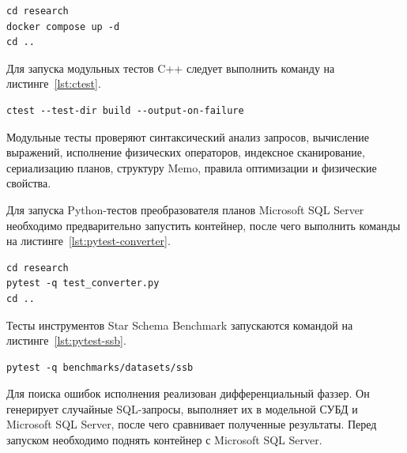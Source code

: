 \documentclass[fontsize=14pt, russian]{scrartcl}
\begin{document}
\begin{listing}[H]
  \caption{Запуск контейнера с Microsoft SQL Server.}
  \label{lst:docker-up}
  \begin{verbatim}
cd research
docker compose up -d
cd ..
  \end{verbatim}
\end{listing}

Для запуска модульных тестов C++ следует выполнить команду на листинге~\ref{lst:ctest}.

\begin{listing}[H]
  \caption{Запуск модульных тестов C++.}
  \label{lst:ctest}
  \begin{verbatim}
ctest --test-dir build --output-on-failure
  \end{verbatim}
\end{listing}

Модульные тесты проверяют синтаксический анализ запросов, вычисление выражений,
исполнение физических операторов, индексное сканирование, сериализацию планов,
структуру Memo, правила оптимизации и физические свойства.

Для запуска Python-тестов преобразователя планов Microsoft SQL Server
необходимо предварительно запустить контейнер, после чего выполнить команды на листинге~\ref{lst:pytest-converter}.

\begin{listing}[H]
  \caption{Запуск тестов преобразователя планов Microsoft SQL Server.}
  \label{lst:pytest-converter}
  \begin{verbatim}
cd research
pytest -q test_converter.py
cd ..
  \end{verbatim}
\end{listing}

Тесты инструментов Star Schema Benchmark запускаются командой на листинге~\ref{lst:pytest-ssb}.

\begin{listing}[H]
  \caption{Запуск тестов инструментов Star Schema Benchmark.}
  \label{lst:pytest-ssb}
  \begin{verbatim}
pytest -q benchmarks/datasets/ssb
  \end{verbatim}
\end{listing}

Для поиска ошибок исполнения реализован дифференциальный фаззер. Он генерирует
случайные SQL-запросы, выполняет их в модельной СУБД и Microsoft SQL Server,
после чего сравнивает полученные результаты. Перед запуском необходимо поднять
контейнер с Microsoft SQL Server.
\end{document}
